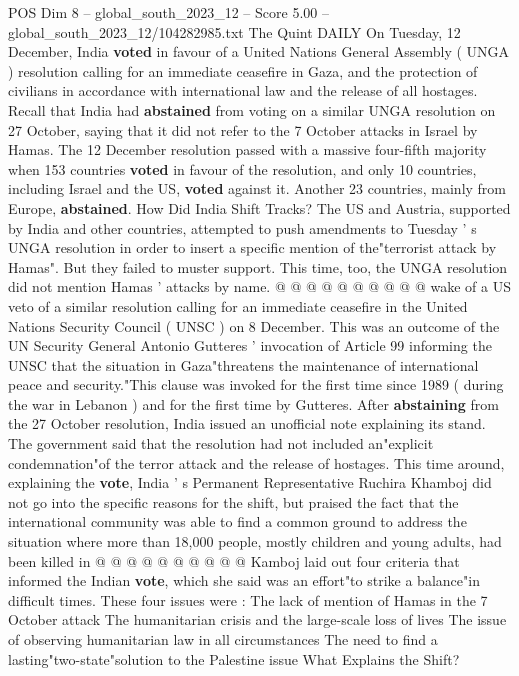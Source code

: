 \begin{textsample}{POS Dim 8 – global\_south\_2023\_12 – Score 5.00 – global\_south\_2023\_12/104282985.txt}  \label{ex:f8_pos_236}
The Quint DAILY On Tuesday, 12 December, India \textbf{voted} in favour of a United Nations General Assembly ( UNGA ) resolution calling for an immediate ceasefire in Gaza, and the protection of civilians in accordance with international law and the release of all hostages.
Recall that India had \textbf{abstained} from voting on a similar UNGA resolution on 27 October, saying that it did not refer to the 7 October attacks in Israel by Hamas.
The 12 December resolution passed with a massive four-fifth majority when 153 countries \textbf{voted} in favour of the resolution, and only 10 countries, including Israel and the US, \textbf{voted} against it.
Another 23 countries, mainly from Europe, \textbf{abstained}.
How Did India Shift Tracks?
The US and Austria, supported by India and other countries, attempted to push amendments to Tuesday ' s UNGA resolution in order to insert a specific mention of the"terrorist attack by Hamas".
But they failed to muster support.
This time, too, the UNGA resolution did not mention Hamas ' attacks by name. @ @ @ @ @ @ @ @ @ @ wake of a US veto of a similar resolution calling for an immediate ceasefire in the United Nations Security Council ( UNSC ) on 8 December.
This was an outcome of the UN Security General Antonio Gutteres ' invocation of Article 99 informing the UNSC that the situation in Gaza"threatens the maintenance of international peace and security."This clause was invoked for the first time since 1989 ( during the war in Lebanon ) and for the first time by Gutteres.
After \textbf{abstaining} from the 27 October resolution, India issued an unofficial note explaining its stand.
The government said that the resolution had not included an"explicit condemnation"of the terror attack and the release of hostages.
This time around, explaining the \textbf{vote}, India ' s Permanent Representative Ruchira Khamboj did not go into the specific reasons for the shift, but praised the fact that the international community was able to find a common ground to address the situation where more than 18,000 people, mostly children and young adults, had been killed in @ @ @ @ @ @ @ @ @ @ Kamboj laid out four criteria that informed the Indian \textbf{vote}, which she said was an effort"to strike a balance"in difficult times.
These four issues were : The lack of mention of Hamas in the 7 October attack The humanitarian crisis and the large-scale loss of lives The issue of observing humanitarian law in all circumstances The need to find a lasting"two-state"solution to the Palestine issue What Explains the Shift?

\end{textsample}
